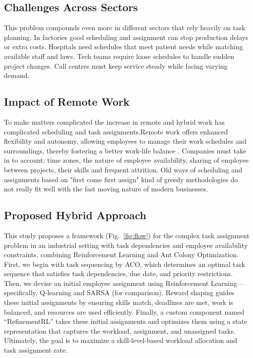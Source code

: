 \documentclass[%
aip,
cp,  %
amsmath,amssymb,
reprint,%
]{revtex4-2}
\begin{document}
	\subsection{\label{subsec:challenges}Challenges Across Sectors}
	This problem compounds even more in different sectors that rely heavily on
	task planning. In factories good scheduling and assignment can stop production
	delays or extra costs. Hospitals need schedules that meet patient needs while
	matching available staff and laws. Tech teams require loose schedules to handle
	sudden project changes. Call centres must keep service steady while facing
	varying demand.
	
	\subsection{\label{subsec:remote}Impact of Remote Work}
	To make matters complicated the increase in remote and hybrid work has complicated scheduling and task assignments.Remote work offers enhanced flexibility and autonomy, allowing employees to manage their work schedules and surroundings, thereby fostering a better work-life balance \cite{wang2023}. Companies must take in to account: time zones, the nature of employee availability, sharing of employee between projects, their skills and frequent attrition. Old ways of scheduling and assignments based on "first come first assign" kind of greedy methodologies do not really fit well with the fast moving nature of modern businesses.
	
	
	
	\subsection{\label{subsec:hybrid}Proposed Hybrid Approach}
	This study proposes a framework (Fig.~\ref{fig:flow}) for the complex task
	assignment problem in an industrial setting with task dependencies and
	employee availability constraints, combining Reinforcement Learning and Ant Colony
	Optimization. First, we begin with task sequencing by ACO, which determines an
	optimal task sequence that satisfies task dependencies, due date, and priority
	restrictions. Then, we devise an initial employee assignment using
	Reinforcement Learning—specifically, Q-learning and SARSA (for comparison).
	Reward shaping guides these initial assignments by ensuring skills match, deadlines
	are met, work is balanced, and resources are used efficiently. Finally, a custom
	component named ``RefinementRL'' takes these initial assignments and optimizes
	them using a state representation that captures the workload, assignment, and unassigned
	tasks. Ultimately, the goal is to maximize a skill-level-based workload allocation
	and task assignment rate.
	
\end{document}

